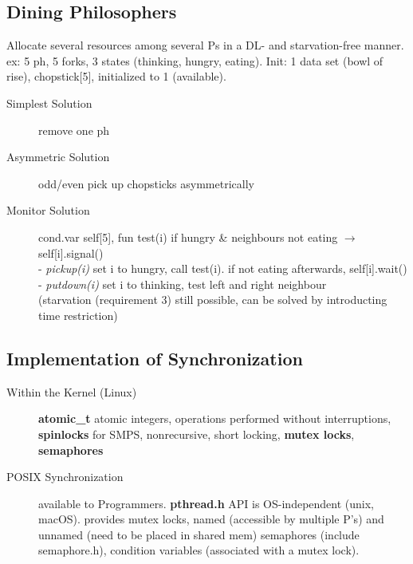 \subsection*{Dining Philosophers}
Allocate several resources among several Ps in a DL- and starvation-free manner. ex: 5 ph, 5 forks, 3 states (thinking, hungry, eating). Init: 1 data set (bowl of rise), chopstick[5], initialized to 1 (available).
\begin{description}
    \item[Simplest Solution] remove one ph
    \item[Asymmetric Solution] odd/even pick up chopsticks asymmetrically
    \item[Monitor Solution]cond.var self[5], fun test(i) if hungry \& neighbours not eating $\rightarrow$ self[i].signal() \\
        - \textit{pickup(i)} set i to hungry, call test(i). if not eating afterwards, self[i].wait() \\
        - \textit{putdown(i)} set i to thinking, test left and right neighbour \\
        (starvation (requirement 3) still possible, can be solved by introducting time restriction)
\end{description}

\subsection*{Implementation of Synchronization}
\begin{description}
    \item[Within the Kernel (Linux)] \textbf{atomic\_t} atomic integers, operations performed without interruptions, \textbf{spinlocks} for SMPS, nonrecursive, short locking, \textbf{mutex locks}, \textbf{semaphores} %
    \item[POSIX Synchronization] available to Programmers. \textbf{pthread.h} API is OS-independent (unix, macOS). provides mutex locks, named (accessible by multiple P's) and unnamed (need to be placed in shared mem) semaphores (include semaphore.h), condition variables (associated with a mutex lock).
\end{description}

